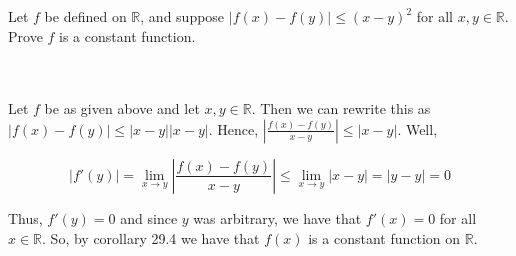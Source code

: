 Let $f$ be defined on $\mathbb{R}$, and suppose $|f(x)-f(y)|\leq(x-y)^2$ for all $x,y\in\mathbb{R}$.
Prove $f$ is a constant function.\\\\

\begin{solution}\renewcommand{\qedsymbol}{}\ \\
    Let $f$ be as given above and let $x,y\in\mathbb{R}$. Then we can rewrite this as
    $|f(x)-f(y)|\leq|x-y||x-y|$. Hence, $|\frac{f(x)-f(y)}{x-y}|\leq|x-y|$. Well,
    
    $$|f'(y)|=\lim_{x\rightarrow y}|\frac{f(x)-f(y)}{x-y}|\leq\lim_{x\rightarrow y}|x-y|=|y-y|=0$$
    
    Thus, $f'(y)=0$ and since $y$ was arbitrary, we have that $f'(x)=0$ for all $x\in\mathbb{R}$. So, by
    corollary 29.4 we have that $f(x)$ is a constant function on $\mathbb{R}$.

\end{solution}